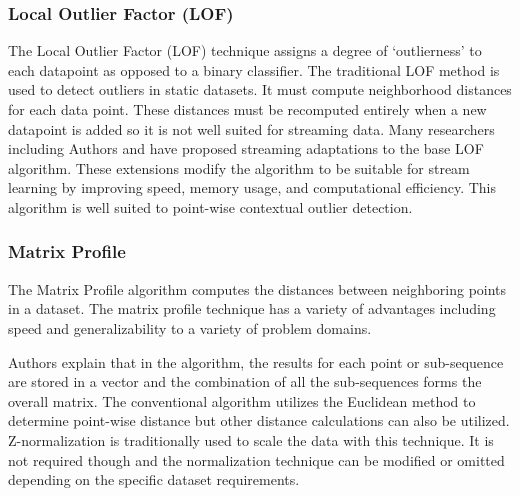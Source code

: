 

\subsubsection{Local Outlier Factor (LOF)}

The Local Outlier Factor (LOF) technique assigns a degree of `outlierness' to each datapoint as opposed to a binary classifier.
The traditional LOF method is used to detect outliers in static datasets.
It must compute neighborhood distances for each data point.
These distances must be recomputed entirely when a new datapoint is added so it is not well suited for streaming data.
Many researchers including Authors \cite{dilof-data-streams} and \cite{fast-memory-efficent-lof-milof} have proposed streaming adaptations to the base LOF algorithm.
These extensions modify the algorithm to be suitable for stream learning by improving speed, memory usage, and computational efficiency.
This algorithm is well suited to point-wise contextual outlier detection.

\subsubsection{Matrix Profile}
\label{ref_matrix-profile-alg}
The Matrix Profile algorithm computes the distances between neighboring points in a dataset.
The matrix profile technique has a variety of advantages including speed and generalizability to a variety of problem domains.

Authors \cite{yeh2016matrix-profile-1} explain that in the algorithm, the results for each point or sub-sequence are stored in a vector and the combination of all the sub-sequences forms the overall matrix.
The conventional algorithm utilizes the Euclidean method to determine point-wise distance but other distance calculations can also be utilized.
Z-normalization is traditionally used to scale the data with this technique.
It is not required though and the normalization technique can be modified or omitted depending on the specific dataset requirements.

